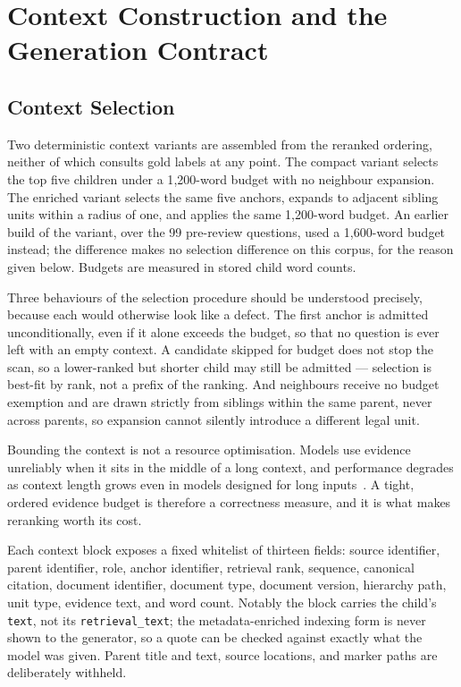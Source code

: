 \section{Context Construction and the Generation Contract}
\label{sec:method-context}

\subsection{Context Selection}

Two deterministic context variants are assembled from the reranked ordering, neither of which consults gold labels at any point. The compact variant selects the top five children under a 1{,}200-word budget with no neighbour expansion. The enriched variant selects the same five anchors, expands to adjacent sibling units within a radius of one, and applies the same 1{,}200-word budget. An earlier build of the variant, over the 99 pre-review questions, used a 1{,}600-word budget instead; the difference makes no selection difference on this corpus, for the reason given below. Budgets are measured in stored child word counts.

Three behaviours of the selection procedure should be understood precisely, because each would otherwise look like a defect. The first anchor is admitted unconditionally, even if it alone exceeds the budget, so that no question is ever left with an empty context. A candidate skipped for budget does not stop the scan, so a lower-ranked but shorter child may still be admitted --- selection is best-fit by rank, not a prefix of the ranking. And neighbours receive no budget exemption and are drawn strictly from siblings within the same parent, never across parents, so expansion cannot silently introduce a different legal unit.

Bounding the context is not a resource optimisation. Models use evidence unreliably when it sits in the middle of a long context, and performance degrades as context length grows even in models designed for long inputs~\cite{liu2024lostmiddle}. A tight, ordered evidence budget is therefore a correctness measure, and it is what makes reranking worth its cost.

Each context block exposes a fixed whitelist of thirteen fields: source identifier, parent identifier, role, anchor identifier, retrieval rank, sequence, canonical citation, document identifier, document type, document version, hierarchy path, unit type, evidence text, and word count. Notably the block carries the child's \texttt{text}, not its \texttt{retrieval\_text}; the metadata-enriched indexing form is never shown to the generator, so a quote can be checked against exactly what the model was given. Parent title and text, source locations, and marker paths are deliberately withheld.

